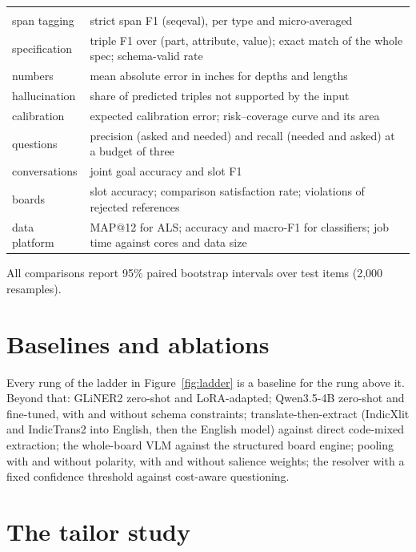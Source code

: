 \begin{table}[h]
\centering\small
\begin{tabularx}{\textwidth}{@{}P{3.6cm}L@{}}
 & \\
span tagging & strict span F1 (seqeval), per type and micro-averaged\\
specification & triple F1 over (part, attribute, value); exact match of the whole spec; schema-valid rate\\
numbers & mean absolute error in inches for depths and lengths\\
hallucination & share of predicted triples not supported by the input\\
calibration & expected calibration error; risk--coverage curve and its area\\
questions & precision (asked and needed) and recall (needed and asked) at a budget of three\\
conversations & joint goal accuracy and slot F1\\
boards & slot accuracy; comparison satisfaction rate; violations of rejected references\\
data platform & MAP@12 for ALS; accuracy and macro-F1 for classifiers; job time against cores and data size\\
\end{tabularx}
\end{table}

All comparisons report 95\% paired bootstrap intervals over test items (2,000 resamples).

\section{Baselines and ablations}

Every rung of the ladder in Figure~\ref{fig:ladder} is a baseline for the rung above it. Beyond that: GLiNER2 zero-shot and LoRA-adapted; Qwen3.5-4B zero-shot and fine-tuned, with and without schema constraints; translate-then-extract (IndicXlit and IndicTrans2 into English, then the English model) against direct code-mixed extraction; the whole-board VLM against the structured board engine; pooling with and without polarity, with and without salience weights; the resolver with a fixed confidence threshold against cost-aware questioning.

\section{The tailor study}

